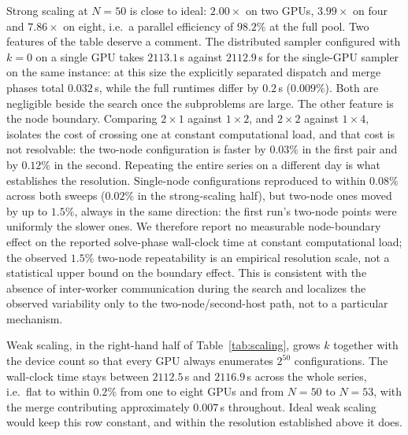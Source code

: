 \documentclass[12pt,a4paper]{elsarticle}
\begin{document}
Strong scaling at $N=50$ is close to ideal: $2.00\times$ on two GPUs, $3.99\times$ on four and
$7.86\times$ on eight, i.e.\ a parallel efficiency of $98.2\%$ at the full pool. Two features
of the table deserve a comment. The distributed sampler configured with $k=0$ on a single GPU
takes $2113.1$\,s against $2112.9$\,s for the single-GPU sampler on the same instance: at this
size the explicitly separated dispatch and merge phases total $0.032$\,s, while the full
runtimes differ by $0.2$\,s ($0.009\%$). Both are negligible beside the search once the
subproblems are large. The other feature is the node boundary. Comparing $2\times1$ against
$1\times2$, and $2\times2$ against $1\times4$, isolates the cost of crossing one at constant
computational load, and that cost is not resolvable: the two-node configuration is faster
by $0.03\%$ in the first pair and by $0.12\%$ in the second. Repeating the entire series on a
different day is what establishes the resolution. Single-node configurations reproduced to
within $0.08\%$ across both sweeps ($0.02\%$ in the strong-scaling half), but two-node ones
moved by up to $1.5\%$, always in the same direction: the first run's two-node points were
uniformly the slower ones. We therefore report no measurable node-boundary effect on the reported
solve-phase wall-clock time at constant computational load; the observed $1.5\%$ two-node
repeatability is
an empirical resolution scale, not a statistical upper bound on the boundary effect. This
is consistent with the absence of inter-worker communication during the search and localizes
the observed variability only to the two-node/second-host path, not to a particular mechanism.

Weak scaling, in the right-hand half of Table~\ref{tab:scaling}, grows $k$ together with the
device count so that every GPU always enumerates $2^{50}$ configurations. The wall-clock time
stays between $2112.5$\,s and $2116.9$\,s across the whole series, i.e.\ flat to within
$0.2\%$ from one to eight GPUs and from $N=50$ to $N=53$, with the merge contributing
approximately $0.007$\,s throughout. Ideal weak scaling would keep this row constant, and within the
resolution established above it does.
\end{document}
